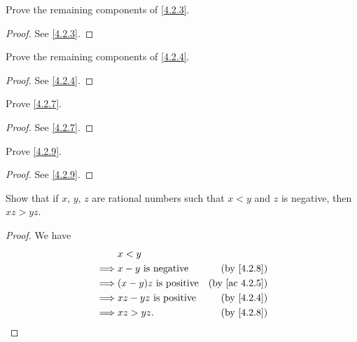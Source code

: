 \begin{exercise}\label{ex 4.2.2}
  Prove the remaining components of \cref{4.2.3}.
\end{exercise}

\begin{proof}
  See \cref{4.2.3}.
\end{proof}

\begin{exercise}\label{ex 4.2.3}
  Prove the remaining components of \cref{4.2.4}.
\end{exercise}

\begin{proof}
  See \cref{4.2.4}.
\end{proof}

\begin{exercise}\label{ex 4.2.4}
  Prove \cref{4.2.7}.
\end{exercise}

\begin{proof}
  See \cref{4.2.7}.
\end{proof}

\begin{exercise}\label{ex 4.2.5}
  Prove \cref{4.2.9}.
\end{exercise}

\begin{proof}
  See \cref{4.2.9}.
\end{proof}

\begin{exercise}\label{ex 4.2.6}
  Show that if \(x\), \(y\), \(z\) are rational numbers such that \(x < y\) and \(z\) is negative, then \(xz > yz\).
\end{exercise}

\begin{proof}
  We have
  \begin{align*}
             & x < y                                                      \\
    \implies & x - y \text{ is negative}    & \text{(by \cref{4.2.8})}    \\
    \implies & (x - y)z \text{ is positive} & \text{(by \cref{ac 4.2.5})} \\
    \implies & xz - yz \text{ is positive}  & \text{(by \cref{4.2.4})}    \\
    \implies & xz > yz.                     & \text{(by \cref{4.2.8})}
  \end{align*}
\end{proof}